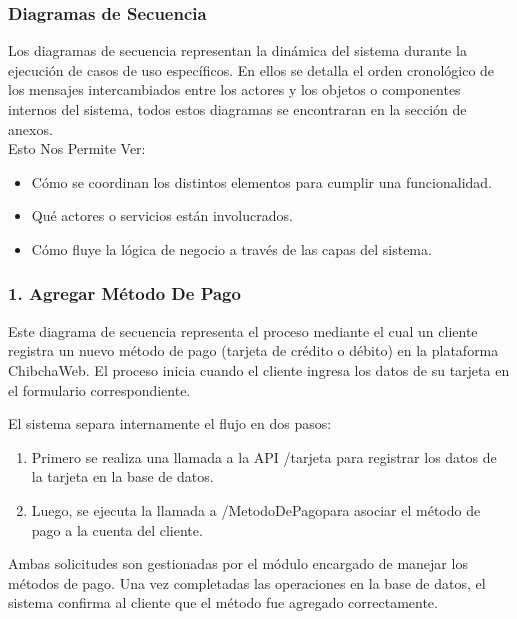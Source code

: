 \subsubsection{Diagramas de Secuencia}

Los diagramas de secuencia representan la dinámica del sistema durante la ejecución de casos de uso específicos. En ellos se detalla el orden cronológico de los mensajes intercambiados entre los actores y los objetos o componentes internos del sistema, todos estos diagramas se encontraran en la sección de anexos.\\

Esto Nos Permite Ver:

\begin{itemize}
\item Cómo se coordinan los distintos elementos para cumplir una funcionalidad.

\item Qué actores o servicios están involucrados.

\item Cómo fluye la lógica de negocio a través de las capas del sistema.
\end{itemize}


\subsubsection*{1. Agregar Método De Pago}

Este diagrama de secuencia representa el proceso mediante el cual un cliente registra un nuevo método de pago (tarjeta de crédito o débito) en la plataforma ChibchaWeb. El proceso inicia cuando el cliente ingresa los datos de su tarjeta en el formulario correspondiente.

El sistema separa internamente el flujo en dos pasos:

\begin{enumerate}
    \item Primero se realiza una llamada a la API /tarjeta para registrar los datos de la tarjeta en la base de datos.
    \item Luego, se ejecuta la llamada a /MetodoDePagopara asociar el método de pago a la cuenta del cliente.
\end{enumerate}

Ambas solicitudes son gestionadas por el módulo encargado de manejar los métodos de pago. Una vez completadas las operaciones en la base de datos, el sistema confirma al cliente que el método fue agregado correctamente.

